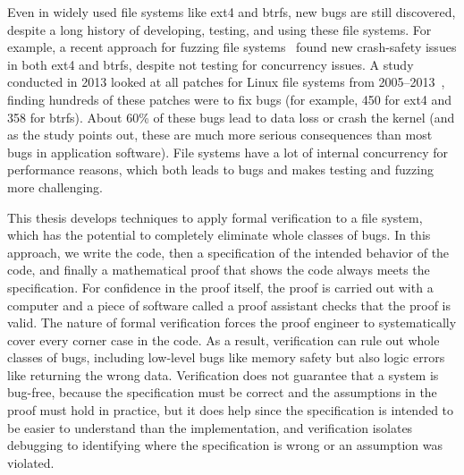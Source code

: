 Even in widely used file systems like ext4 and btrfs, new bugs are still discovered,
despite a long history of developing, testing, and using these file systems. For
example, a
recent approach for fuzzing file systems~\cite{kim:hydra} found new crash-safety
issues in both ext4 and btrfs, despite not testing for concurrency issues. A
study conducted in 2013 looked at all patches for Linux file systems from
2005--2013~\cite{lu:fsstudy}, finding hundreds of these patches were to fix bugs
(for example, 450 for ext4 and 358 for btrfs). About 60\% of these bugs lead to
data loss or crash the kernel (and as the study points out, these are much more
serious consequences than most bugs in application software). File systems have
a lot of internal concurrency for performance reasons, which both leads to bugs
and makes testing and fuzzing more challenging.

This thesis develops techniques to apply formal verification to a file system,
which has the potential to completely eliminate whole classes of bugs.
In this approach, we write the code, then a specification of the
intended behavior of the code, and finally a mathematical proof that shows the
code always meets the specification. For confidence in the proof itself, the
proof is carried out with a computer and a piece of software called a proof
assistant checks that the proof is valid. The nature of formal verification
forces the proof engineer to systematically cover every corner case in the code.
As a result, verification can rule out whole classes of bugs, including
low-level bugs like memory safety but also logic errors like returning the wrong
data. Verification does not guarantee that a system is bug-free, because the
specification must be correct and the assumptions in the proof must hold in
practice, but it does help since the specification is intended to be easier to
understand than the implementation, and verification isolates debugging to
identifying where the specification is wrong or an assumption was violated.


